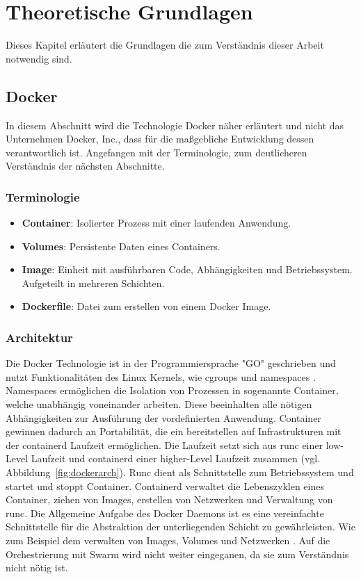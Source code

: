 \chapter{Theoretische Grundlagen}
Dieses Kapitel erläutert die Grundlagen die zum 
Verständnis dieser Arbeit notwendig sind. 


\section{Docker}

In diesem Abschnitt wird die Technologie \glqq Docker\grqq{} näher erläutert und
nicht das Unternehmen \glqq Docker, Inc.\grqq{}, dass für die maßgebliche Entwicklung dessen verantwortlich ist.
Angefangen mit der Terminologie, zum deutlicheren Verständnis der nächsten Abschnitte.

\subsection{Terminologie}
\begin{itemize}
    \item \textbf{Container}: Isolierter Prozess mit einer laufenden Anwendung.
    \item \textbf{Volumes}: Persistente Daten eines Containers.
    \item \textbf{Image}: Einheit mit ausführbaren Code, Abhängigkeiten und Betriebssystem. Aufgeteilt in mehreren Schichten.
    \item \textbf{Dockerfile}: Datei zum erstellen von einem Docker Image.    
\end{itemize}

\subsection{Architektur}
Die Docker Technologie ist in der Programmiersprache "GO" geschrieben und nutzt Funktionalitäten des
Linux Kernels, wie cgroups und namespaces \cite{dockergetstarted}.
Namespaces ermöglichen die Isolation von Prozessen in sogenannte Container, welche unabhängig voneinander arbeiten.
Diese beeinhalten alle nötigen Abhängigkeiten zur Ausführung der vordefinierten Anwendung.
Container gewinnen dadurch an Portabilität, die ein bereitstellen auf Infrastrukturen mit der containerd
Laufzeit ermöglichen.
Die Laufzeit setzt sich aus \glqq runc\grqq{} einer low-Level Laufzeit und \glqq containerd\grqq{} einer higher-Level
Laufzeit zusammen (vgl. Abbildung~\ref{fig:dockerarch}).
Runc dient als Schnittstelle zum Betriebssystem und startet und stoppt Container.
Containerd verwaltet die Lebenszyklen eines Container, ziehen von Images, erstellen von Netzwerken und
Verwaltung von runc.
Die Allgemeine Aufgabe des Docker Daemons ist es eine vereinfachte Schnittstelle für die Abstraktion
der unterliegenden Schicht zu gewährleisten. Wie zum Beispiel dem verwalten von Images, Volumes und Netzwerken \cite{dockerdeep}.
Auf die Orchestrierung mit Swarm wird nicht weiter eingeganen, da sie zum Verständnis nicht nötig ist.


